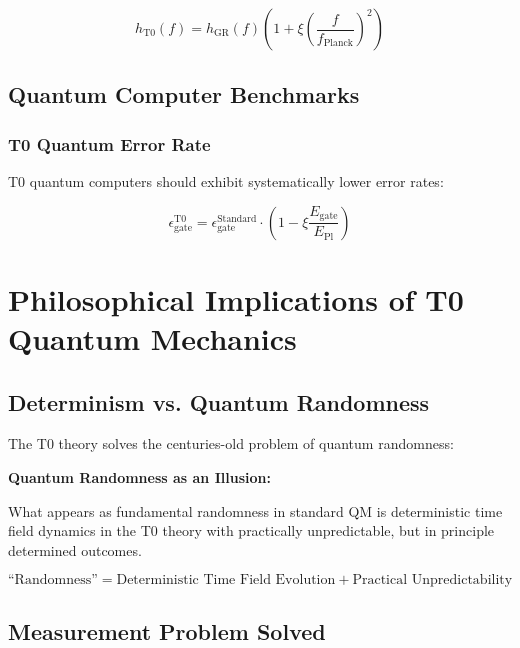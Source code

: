 \documentclass[12pt,a4paper]{article}
\newcommand{\xipar}{\xi}
\newcommand{\EPlanck}{E_{\text{Pl}}}
\begin{document}
	\begin{equation}
		h_{\text{T0}}(f) = h_{\text{GR}}(f) \left(1 + \xipar \left(\frac{f}{f_{\text{Planck}}}\right)^2\right)
	\end{equation}
	
	\subsection{Quantum Computer Benchmarks}
	
	\subsubsection{T0 Quantum Error Rate}
	
	T0 quantum computers should exhibit systematically lower error rates:
	
	\begin{equation}
		\epsilon_{\text{gate}}^{\text{T0}} = \epsilon_{\text{gate}}^{\text{Standard}} \cdot \left(1 - \xipar \frac{E_{\text{gate}}}{\EPlanck}\right)
	\end{equation}
	
	\section{Philosophical Implications of T0 Quantum Mechanics}
	
	\subsection{Determinism vs. Quantum Randomness}
	
	The T0 theory solves the centuries-old problem of quantum randomness:
	
	\begin{tcolorbox}[colback=purple!5!white,colframe=purple!75!black,title={T0 Determinism}]
		\textbf{Quantum Randomness as an Illusion:}
		
		What appears as fundamental randomness in standard QM is deterministic time field dynamics in the T0 theory with practically unpredictable, but in principle determined outcomes.
		
		\begin{equation}
			\text{``Randomness''} = \text{Deterministic Time Field Evolution} + \text{Practical Unpredictability}
		\end{equation}
	\end{tcolorbox}
	
	\subsection{Measurement Problem Solved}
	
\end{document}
